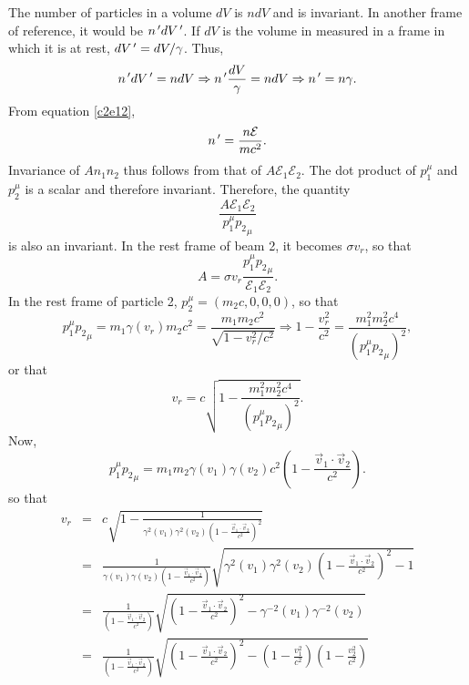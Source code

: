 \begin{enumerate}
The number of particles in a volume $dV$ is $ndV$ and is invariant. In another
frame of reference, it would be $n^{\,\prime} dV^{\,\prime}$. If $dV$ is the volume in 
measured in a frame in which it is at rest, $dV^{\,\prime} = dV/\gamma$. Thus,
\begin{equation}\label{c2e48}
n^{\,\prime} dV^{\,\prime} = n dV \Rightarrow n^{\,\prime}\frac{dV}{\gamma} = ndV \Rightarrow n^{\,\prime}
= n\gamma.
\end{equation}
From equation \eqref{c2e12}, 
\begin{equation}\label{c2e49}
n^{\,\prime} = \frac{n\mathcal{E}}{mc^2}.
\end{equation}
Invariance of $An_1n_2$ thus follows from that of $A\mathcal{E}_1\mathcal{E}_2$.
The dot product of $p_1^\mu$ and $p_2^\mu$ is a scalar and therefore invariant.
Therefore, the quantity
\[
\frac{A\mathcal{E}_1\mathcal{E}_2}{p_1^\mu {p_2}_\mu}
\]
is also an invariant. In the rest frame of beam 2, it becomes $\sigma v_r$, so 
that
\begin{equation}\label{c2e50}
A = \sigma v_r\frac{p_1^\mu {p_2}_\mu}{\mathcal{E}_1\mathcal{E}_2}.
\end{equation}
In the rest frame of particle 2, $p_2^\mu = (m_2c, 0, 0, 0)$, so that 
\[
p_1^\mu {p_2}_\mu = m_1\gamma(v_r) m_2 c^2 = 
\frac{m_1m_2c^2}{\sqrt{1 - v_r^2/c^2}} \Rightarrow 1 - \frac{v_r^2}{c^2} = 
\frac{m_1^2m_2^2c^4}{(p_1^\mu {p_2}_\mu)^2},
\]
or that
\begin{equation}\label{c2e51}
v_r = c\sqrt{1 - \frac{m_1^2m_2^2c^4}{(p_1^\mu {p_2}_\mu)^2}}.
\end{equation}
Now, 
\[
p_1^\mu {p_2}_\mu = m_1m_2\gamma(v_1)\gamma(v_2)c^2
\left(1 - \frac{\vec{v}_1\cdot\vec{v}_2}{c^2}\right).
\]
so that
\begin{eqnarray*}
v_r &=& c\sqrt{1 - \frac{1}{\gamma^2(v_1)\gamma^2(v_2)
    \left(1 - \frac{\vec{v}_1\cdot\vec{v}_2}{c^2}\right)^2}} \\
 &=& \frac{1}{\gamma(v_1)\gamma(v_2)
     \left(1 - \frac{\vec{v}_1\cdot\vec{v}_2}{c^2}\right)}
 	\sqrt{\gamma^2(v_1)\gamma^2(v_2)
 	\left(1 - \frac{\vec{v}_1\cdot\vec{v}_2}{c^2}\right)^2 - 1} \\
 &=& \frac{1}{\left(1 - \frac{\vec{v}_1\cdot\vec{v}_2}{c^2}\right)}
 \sqrt{\left(1 - \frac{\vec{v}_1\cdot\vec{v}_2}{c^2}\right)^2 - 
  \gamma^{-2}(v_1)\gamma^{-2}(v_2)} \\
 &=& \frac{1}{\left(1 - \frac{\vec{v}_1\cdot\vec{v}_2}{c^2}\right)}
 \sqrt{\left(1 - \frac{\vec{v}_1\cdot\vec{v}_2}{c^2}\right)^2 - 
 \left(1 - \frac{v_1^2}{c^2}\right)
 \left(1 - \frac{v_2^2}{c^2}\right)}
\end{eqnarray*}

\end{enumerate}
